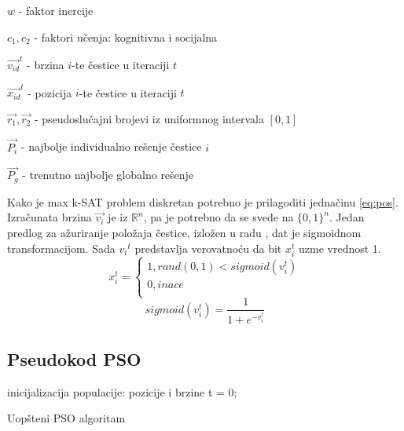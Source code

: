 \documentclass{article}
\begin{document}
\begin{list}{•}{}
	\item $w$ - faktor inercije
	\item $c_1, c_2$ - faktori učenja: kognitivna i socijalna
	\item $\vec{v_{id}}^{t}$ - brzina $i$-te čestice u iteraciji $t$ 
	\item $\vec{x_{id}}^{t}$ - pozicija $i$-te čestice u iteraciji $t$ 
	\item $\vec{r_1}, \vec{r_2}$ - pseudoslučajni brojevi iz uniformnog intervala $[0,1]$
	\item $\vec{P_i}$ - najbolje individualno rešenje čestice $i$
	\item $\vec{P_g}$ - trenutno najbolje globalno rešenje\\ 
\end{list}

Kako je max k-SAT problem diskretan potrebno je prilagoditi jednačinu \ref{eq:pos}. Izračunata brzina $\vec{v_{i}}$ je iz $\mathbb{R}^n$, pa je potrebno da se svede na $\{ 0,1 \}^n$. Jedan predlog za ažuriranje položaja čestice, izložen u radu \cite{sigmoid}, dat je sigmoidnom transformacijom. Sada ${v_{i}}^{t}$ predstavlja verovatnoću da bit $x_{i}^{t}$ uzme vrednost 1.  \\

\begin{equation}\label{eq:posSIGMOID}
x_{i}^{t}=\begin{cases}
               1, rand(0,1) < sigmoid(v_{i}^{t})\\
               0, inace\\
            \end{cases}
\end{equation}\label{eq:sigmoid}
\begin{equation}
sigmoid(v_{i}^{t}) = \frac{1}{1+e^{-v_{i}^{t}}}
\end{equation}
 
 
\subsection{Pseudokod PSO}

\begin{algorithm}[H]
\SetAlgoLined
{}

\BlankLine
 inicijalizacija populacije: pozicije i brzine\;
 t = 0; \\
 \caption{Uopšteni PSO algoritam}
\end{algorithm}
\end{document}
